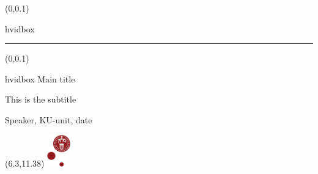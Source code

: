 \documentclass[t,24pt,aspectratio=169]{beamer}
\begin{document}
{
\begin{frame}
    \begin{textblock*}{\textwidth}(0\textwidth,0.1\textheight)
        \begin{beamercolorbox}[wd=7.8cm,ht=7.3cm,sep=0.5cm]{hvidbox}
            \fontsize{5}{10}\selectfont {}
            \noindent\textcolor{KUrod}{\rule{6.8cm}{0.4pt}}
        \end{beamercolorbox}
    \end{textblock*}
    \begin{textblock*}{\textwidth}(0\textwidth,0.1\textheight)
        \begin{beamercolorbox}[wd=7.8cm,sep=0.5cm]{hvidbox}
                \Huge \textcolor{KUrod}{Main title}
                \vspace{0.5cm}
                \par
                \Large This is the subtitle
                \vspace{0.5cm}
                \par
                \normalsize Speaker, KU-unit, date
        \end{beamercolorbox}
    \end{textblock*}
    \begin{textblock}{1}(6.3,11.38)
        \includegraphics[width=1cm]{KU/KU-logo.png}
    \end{textblock}
\end{frame}
}
\end{document}
